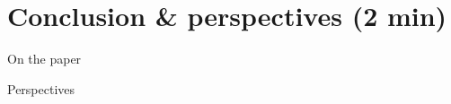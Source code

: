 \section{Conclusion \& perspectives (2 min)}
\begin{frame}{On the paper}
    
\end{frame}
\begin{frame}{Perspectives}
    
\end{frame}